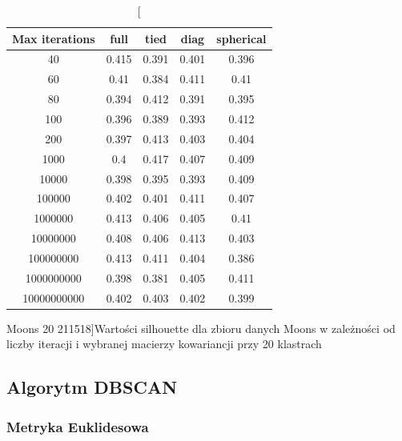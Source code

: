 \documentclass{classrep}
\begin{document}
{{\begin{table}[!htbp]
                \begin{minipage}{1\textwidth}
                \centering
                \begin{tabular}{|c|c|c|c|c|}
                \hline
                Max iterations & full & tied & diag & spherical \\ \hline
                40 & 0.415 & 0.391 & 0.401 & 0.396 \\ \hline
                60 & 0.41 & 0.384 & 0.411 & 0.41 \\ \hline
                80 & 0.394 & 0.412 & 0.391 & 0.395 \\ \hline
                100 & 0.396 & 0.389 & 0.393 & 0.412 \\ \hline
                200 & 0.397 & 0.413 & 0.403 & 0.404 \\ \hline
                1000 & 0.4 & 0.417 & 0.407 & 0.409 \\ \hline
                10000 & 0.398 & 0.395 & 0.393 & 0.409 \\ \hline
                100000 & 0.402 & 0.401 & 0.411 & 0.407 \\ \hline
                1000000 & 0.413 & 0.406 & 0.405 & 0.41 \\ \hline
                10000000 & 0.408 & 0.406 & 0.413 & 0.403 \\ \hline
                100000000 & 0.413 & 0.411 & 0.404 & 0.386 \\ \hline
                1000000000 & 0.398 & 0.381 & 0.405 & 0.411 \\ \hline
                10000000000 & 0.402 & 0.403 & 0.402 & 0.399 \\ \hline
                \end{tabular}
                \caption
                [Moons 20 211518]{Wartości silhouette dla zbioru danych Moons w zależności od liczby iteracji i wybranej macierzy kowariancji przy 20 klastrach}
                \label{Moons_20_211518}
                \end{minipage}
                \hfill
            \end{table}
        }
        \newpage

        \subsection{Algorytm DBSCAN}
        \label{result_4} {

            \subsubsection{Metryka Euklidesowa}
            \label{dbscan_eucl} {

}}}
\end{document}
